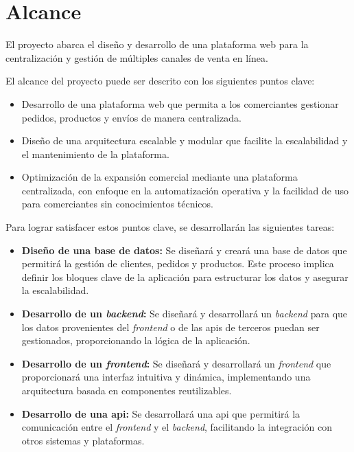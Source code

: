 \section{Alcance}
\label{intro:sec:alcance}

El proyecto abarca el diseño y desarrollo de una plataforma web para la centralización y gestión de múltiples canales de venta en línea.

El alcance del proyecto puede ser descrito con los siguientes puntos clave:

\begin{itemize}
    \item Desarrollo de una plataforma web que permita a los comerciantes gestionar pedidos, productos y envíos de manera centralizada.
    \item Diseño de una arquitectura escalable y modular que facilite la escalabilidad y el mantenimiento de la plataforma.
    \item Optimización de la expansión comercial mediante una plataforma centralizada, con enfoque en la automatización operativa y la facilidad de uso para comerciantes sin conocimientos técnicos.
\end{itemize}

Para lograr satisfacer estos puntos clave, se desarrollarán las siguientes tareas:

\begin{itemize}
    \item \textbf{Diseño de una base de datos:} Se diseñará y creará una base de datos que permitirá la gestión de clientes, pedidos y productos. Este proceso implica definir los bloques clave de la aplicación para estructurar los datos y asegurar la escalabilidad.
    \item \textbf{Desarrollo de un \textit{backend}:} Se diseñará y desarrollará un \textit{backend} para que los datos provenientes del \textit{frontend} o de las \gls{api}s de terceros puedan ser gestionados, proporcionando la lógica de la aplicación.
    \item \textbf{Desarrollo de un \textit{frontend}:} Se diseñará y desarrollará un \textit{frontend} que proporcionará una interfaz intuitiva y dinámica, implementando una arquitectura basada en componentes reutilizables.
    \item \textbf{Desarrollo de una \gls{api}:} Se desarrollará una \gls{api} que permitirá la comunicación entre el \textit{frontend} y el \textit{backend}, facilitando la integración con otros sistemas y plataformas.
\end{itemize}

